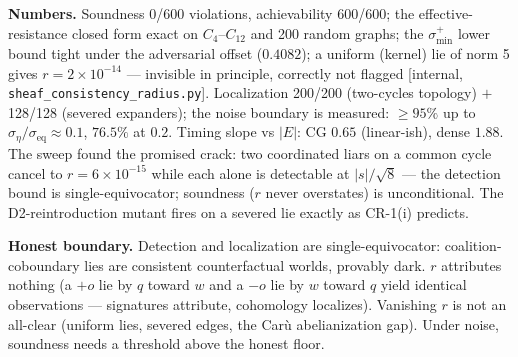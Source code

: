 \documentclass[11pt,a4paper]{article}
\begin{document}
\textbf{Numbers.} Soundness 0/600 violations, achievability 600/600; the effective-resistance closed form exact on $C_4$--$C_{12}$ and 200 random graphs; the $\sigma^{+}_{\min}$ lower bound tight under the adversarial offset ($0.4082$); a uniform (kernel) lie of norm 5 gives $r = 2{\times}10^{-14}$ --- invisible in principle, correctly not flagged [internal, \texttt{sheaf\_consistency\_radius.py}]. Localization 200/200 (two-cycles topology) $+$ 128/128 (severed expanders); the noise boundary is measured: $\ge 95\%$ up to $\sigma_\eta/\sigma_{\mathrm{eq}} \approx 0.1$, $76.5\%$ at $0.2$. Timing slope vs $|E|$: CG $0.65$ (linear-ish), dense $1.88$. The sweep found the promised crack: two coordinated liars on a common cycle cancel to $r = 6{\times}10^{-15}$ while each alone is detectable at $|s|/\sqrt{8}$ --- the detection bound is single-equivocator; soundness ($r$ never overstates) is unconditional. The D2-reintroduction mutant fires on a severed lie exactly as CR-1(i) predicts.

\begin{boundary}
\textbf{Honest boundary.} Detection and localization are single-equivocator: coalition-coboundary lies are consistent counterfactual worlds, provably dark. $r$ attributes nothing (a $+o$ lie by $q$ toward $w$ and a $-o$ lie by $w$ toward $q$ yield identical observations --- signatures attribute, cohomology localizes). Vanishing $r$ is not an all-clear (uniform lies, severed edges, the Car\`u abelianization gap). Under noise, soundness needs a threshold above the honest floor.
\end{boundary}
\end{document}
